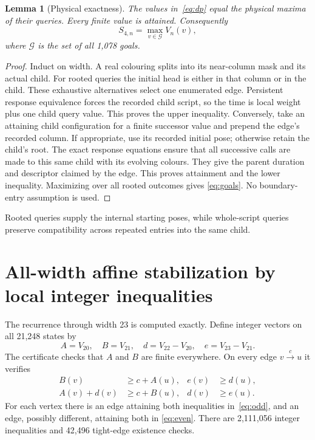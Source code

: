 \documentclass[11pt]{article}
\newtheorem{lemma}[theorem]{Lemma}
\theoremstyle{definition}\newtheorem{definition}[theorem]{Definition}
\begin{document}
\begin{lemma}[Physical exactness]\label{lem:exact}
The values in~\eqref{eq:dp} equal the physical maxima of their queries. Every
finite value is attained. Consequently
\begin{equation}\label{eq:goals}
 S_{4,n}=\max_{v\in\mathcal G}V_n(v),
\end{equation}
where $\mathcal G$ is the set of all 1,078 goals.
\end{lemma}
\begin{proof}
Induct on width. A real colouring splits into its near-column mask and its actual
child. For rooted queries the initial head is either in that column or in the
child. These exhaustive alternatives select one enumerated edge. Persistent
response equivalence forces the recorded child script, so the time is local
weight plus one child query value. This proves the upper inequality.
Conversely, take an attaining child configuration for a finite successor value
and prepend the edge's recorded column. If appropriate, use its recorded initial
pose; otherwise retain the child's root. The exact response equations ensure
that all successive calls are made to this same child with its evolving colours.
They give the parent duration and descriptor claimed by the edge. This proves
attainment and the lower inequality. Maximizing over all rooted outcomes gives
\eqref{eq:goals}. No boundary-entry assumption is used.
\end{proof}

Rooted queries supply the internal starting poses, while whole-script
queries preserve compatibility across repeated entries into the same child.

\section{All-width affine stabilization by local integer inequalities}
The recurrence through width 23 is computed exactly. Define integer vectors
on all 21,248 states by
\[
 A=V_{20},\quad B=V_{21},\quad d=V_{22}-V_{20},\quad e=V_{23}-V_{21}.
\]
The certificate checks that $A$ and $B$ are finite everywhere. On every edge
$v\xrightarrow{c}u$ it verifies
\begin{align}
 B(v)&\ge c+A(u),& e(v)&\ge d(u),\label{eq:odd}\\[2pt]
 A(v)+d(v)&\ge c+B(u),& d(v)&\ge e(u).\label{eq:even}
\end{align}
For each vertex there is an edge attaining both inequalities
in~\eqref{eq:odd}, and an edge, possibly different, attaining both in
\eqref{eq:even}. There are 2,111,056 integer inequalities and 42,496 tight-edge
existence checks.
\end{document}
